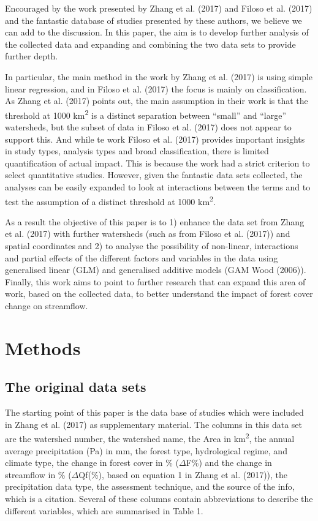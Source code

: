 \documentclass[]{elsarticle} %
\begin{document}
Encouraged by the work presented by Zhang et al. (2017) and Filoso et
al. (2017) and the fantastic database of studies presented by these
authors, we believe we can add to the discussion. In this paper, the aim
is to develop further analysis of the collected data and expanding and
combining the two data sets to provide further depth.

In particular, the main method in the work by Zhang et al. (2017) is
using simple linear regression, and in Filoso et al. (2017) the focus is
mainly on classification. As Zhang et al. (2017) points out, the main
assumption in their work is that the threshold at 1000
km\textsuperscript{2} is a distinct separation between ``small'' and
``large'' watersheds, but the subset of data in Filoso et al. (2017)
does not appear to support this. And while te work Filoso et al. (2017)
provides important insights in study types, analysis types and broad
classification, there is limited quantification of actual impact. This
is because the work had a strict criterion to select quantitative
studies. However, given the fantastic data sets collected, the analyses
can be easily expanded to look at interactions between the terms and to
test the assumption of a distinct threshold at 1000
km\textsuperscript{2}.

As a result the objective of this paper is to 1) enhance the data set
from Zhang et al. (2017) with further watersheds (such as from Filoso et
al. (2017)) and spatial coordinates and 2) to analyse the possibility of
non-linear, interactions and partial effects of the different factors
and variables in the data using generalised linear (GLM) and generalised
additive models (GAM Wood (2006)). Finally, this work aims to point to
further research that can expand this area of work, based on the
collected data, to better understand the impact of forest cover change
on streamflow.

\hypertarget{methods}{%
\section{Methods}\label{methods}}

\hypertarget{the-original-data-sets}{%
\subsection{The original data sets}\label{the-original-data-sets}}

The starting point of this paper is the data base of studies which were
included in Zhang et al. (2017) as supplementary material. The columns
in this data set are the watershed number, the watershed name, the Area
in km\textsuperscript{2}, the annual average precipitation (Pa) in mm,
the forest type, hydrological regime, and climate type, the change in
forest cover in \% (\(\Delta\)F\%) and the change in streamflow in \%
(\(\Delta\)Qf(\%), based on equation 1 in Zhang et al. (2017)), the
precipitation data type, the assessment technique, and the source of the
info, which is a citation. Several of these columns contain
abbreviations to describe the different variables, which are summarised
in Table 1.
\end{document}
